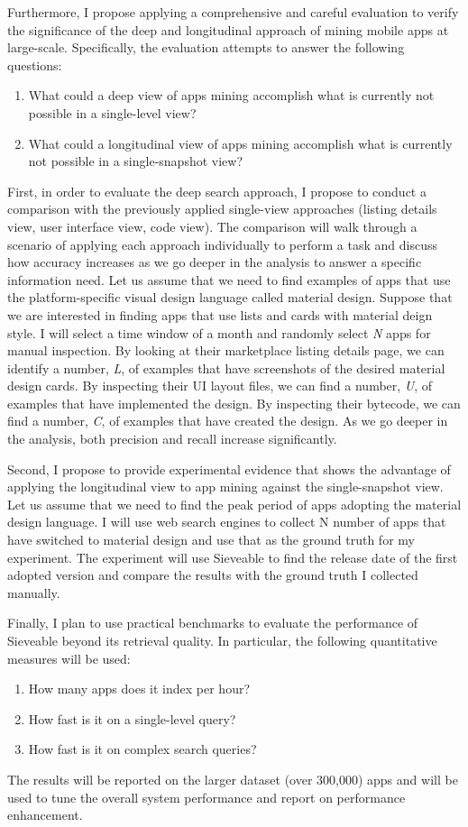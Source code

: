 Furthermore, I propose applying a comprehensive and careful evaluation to verify the significance of the deep and longitudinal approach of mining mobile apps at large-scale.
Specifically, the evaluation attempts to answer the following questions:
\begin{enumerate}
	\item What could a deep view of apps mining accomplish what is currently not possible in a single-level view?
	\item What could a longitudinal view of apps mining accomplish what is currently not possible in a single-snapshot view?
\end{enumerate}

First, in order to evaluate the deep search approach, I propose to conduct a comparison with the previously applied single-view approaches (listing details view, user interface view, code view).
The comparison will walk through a scenario of applying each approach individually to perform a task and discuss how accuracy increases as we go deeper in the analysis to answer a specific information need.
Let us assume that we need to find examples of apps that use the platform-specific visual design language called material design.
Suppose that we are interested in finding apps that use lists and cards with material deign style.
I will select a time window of a month and randomly select \textit{N} apps for manual inspection.
By looking at their marketplace listing details page, we can identify a number, \textit{L}, of examples that have screenshots of the desired material design cards.
By inspecting their UI layout files, we can find a number, \textit{U}, of examples that have implemented the design.
By inspecting their bytecode, we can find a number, \textit{C}, of examples that have created the design.
As we go deeper in the analysis, both precision and recall increase significantly.

Second, I propose to provide experimental evidence that shows the advantage of applying the longitudinal view to app mining against the single-snapshot view.
Let us assume that we need to find the peak period of apps adopting the material design language.
I will use web search engines to collect N number of apps that have switched to material design and use that as the ground truth for my experiment.
The experiment will use Sieveable to find the release date of the first adopted version and compare the results with the ground truth I collected manually.

Finally, I plan to use practical benchmarks to evaluate the performance of Sieveable beyond its retrieval quality. In particular, the following quantitative measures will be used:
\begin{enumerate}
	\item How many apps does it index per hour?
	\item How fast is it on a single-level query?
	\item How fast is it on complex search queries?
\end{enumerate}
The results will be reported on the larger dataset (over 300,000) apps and will be used to tune the overall system performance and report on performance enhancement.

